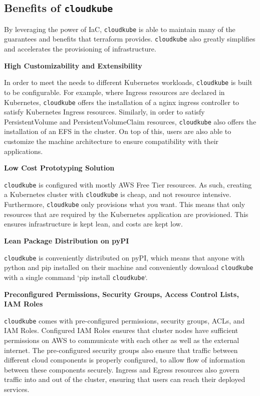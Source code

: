 \subsection{Benefits of \texttt{cloudkube}}
By leveraging the power of IaC, \texttt{cloudkube} is able to maintain many of the guarantees and benefits that terraform provides. \texttt{cloudkube} also greatly simplifies and accelerates the provisioning of infrastructure. 

\textbf{High Customizability and Extensibility}

In order to meet the needs to different Kubernetes workloads, \texttt{cloudkube} is built to be configurable. For example, where Ingress resources are declared in Kubernetes, \texttt{cloudkube} offers the installation of a nginx ingress controller to satisfy Kubernetes Ingress resources. Similarly, in order to satisfy PersistentVolume and PersistentVolumeClaim resources, \texttt{\texttt{cloudkube}} also offers the installation of an EFS in the cluster. On top of this, users are also able to customize the machine architecture to ensure compatibility with their applications. 

\textbf{Low Cost Prototyping Solution}

\texttt{cloudkube} is configured with mostly AWS Free Tier resources. As such, creating a Kubernetes cluster with \texttt{cloudkube} is cheap, and not resource intensive. Furthermore, \texttt{cloudkube} only provisions what you want. This means that only resources that are required by the Kubernetes application are provisioned. This ensures infrastructure is kept lean, and costs are kept low. 

\textbf{Lean Package Distribution on pyPI}

\texttt{cloudkube} is conveniently distributed on pyPI, which means that anyone with python and pip installed on their machine and conveniently download \texttt{cloudkube} with a single command `pip install \texttt{cloudkube}`.

\textbf{Preconfigured Permissions, Security Groups, Access Control Lists, IAM Roles}

\texttt{cloudkube} comes with pre-configured permissions, security groups, ACLs, and IAM Roles. Configured IAM Roles ensures that cluster nodes have sufficient permissions on AWS to communicate with each other as well as the external internet. The pre-configured security groups also ensure that traffic between different cloud components is properly configured, to allow flow of information between these components securely. Ingress and Egress resources also govern traffic into and out of the cluster, ensuring that users can reach their deployed services.

